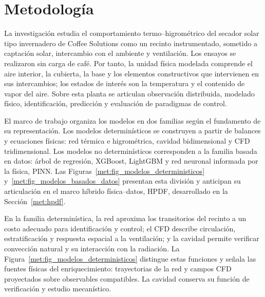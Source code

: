 
\providecommand{\rutafigurasmetodologia}{figuras_metodologia}
\providecommand{\rutacodigometodologia}{codigo_metodologia}
\providecommand{\rutatablasmetodologia}{tablas_metodologia}

\clearpage
\chapter{Metodología}
\label{ch:metodologia}

La investigación estudia el comportamiento termo--higrométrico del secador solar tipo invernadero de Coffee Solutions como un recinto instrumentado, sometido a captación solar, intercambio con el ambiente y ventilación. Los ensayos se realizaron sin carga de café. Por tanto, la unidad física modelada comprende el aire interior, la cubierta, la base y los elementos constructivos que intervienen en sus intercambios; los estados de interés son la temperatura y el contenido de vapor del aire. Sobre esta planta se articulan observación distribuida, modelado físico, identificación, predicción y evaluación de paradigmas de control.

El marco de trabajo organiza los modelos en dos familias según el fundamento de su representación. Los modelos determinísticos se construyen a partir de balances y ecuaciones físicas: red térmica e higrométrica, cavidad bidimensional y CFD tridimensional. Los modelos no determinísticos corresponden a la familia basada en datos: árbol de regresión, XGBoost, LightGBM y red neuronal informada por la física, PINN. Las Figuras~\ref{met:fig_modelos_deterministicos} y~\ref{met:fig_modelos_basados_datos} presentan esta división y anticipan su articulación en el marco híbrido física--datos, HPDF, desarrollado en la Sección~\ref{met:hpdf}.

En la familia determinística, la red aproxima los transitorios del recinto a un costo adecuado para identificación y control; el CFD describe circulación, estratificación y respuesta espacial a la ventilación; y la cavidad permite verificar convección natural y su interacción con la radiación. La Figura~\ref{met:fig_modelos_deterministicos} distingue estas funciones y señala las fuentes físicas del enriquecimiento: trayectorias de la red y campos CFD proyectados sobre observables compatibles. La cavidad conserva su función de verificación y estudio mecanístico.

